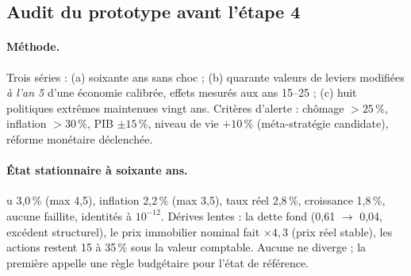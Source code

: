 \documentclass[11pt,a4paper]{article}
\begin{document}
\subsection{Audit du prototype avant l'étape 4}
\label{sec:audit}
\paragraph{Méthode.} Trois séries : (a) soixante ans sans choc ; (b) quarante valeurs de leviers modifiées \emph{à l'an 5} d'une économie calibrée, effets mesurés aux ans 15--25 ; (c) huit politiques extrêmes maintenues vingt ans. Critères d'alerte : chômage $>25\,\%$, inflation $>30\,\%$, PIB $\pm15\,\%$, niveau de vie $+10\,\%$ (méta-stratégie candidate), réforme monétaire déclenchée.

\paragraph{État stationnaire à soixante ans.} u 3,0\,\% (max 4,5), inflation 2,2\,\% (max 3,5), taux réel 2,8\,\%, croissance 1,8\,\%, aucune faillite, identités à $10^{-12}$. Dérives lentes : la dette fond (0,61 $\to$ 0,04, excédent structurel), le prix immobilier nominal fait $\times4{,}3$ (prix réel stable), les actions restent 15 à 35\,\% sous la valeur comptable. Aucune ne diverge ; la première appelle une règle budgétaire pour l'état de référence.
\end{document}
